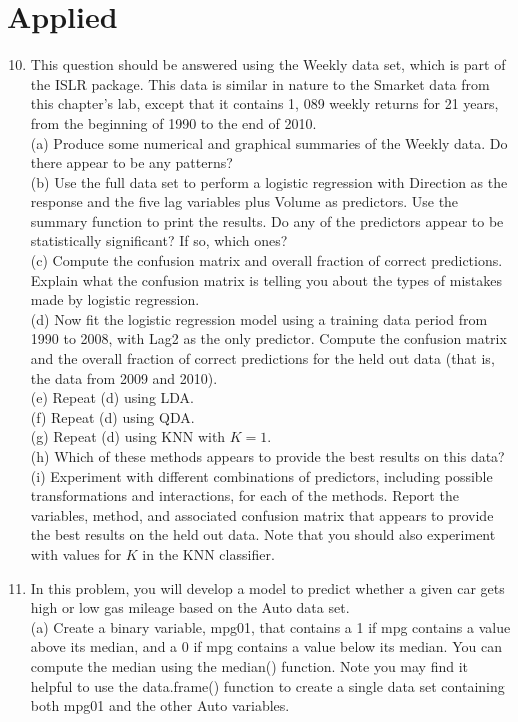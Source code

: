 \documentclass[10pt]{article}
\begin{document}
\section*{Applied}
\begin{enumerate}
  \setcounter{enumi}{9}
  \item This question should be answered using the Weekly data set, which is part of the ISLR package. This data is similar in nature to the Smarket data from this chapter's lab, except that it contains 1, 089 weekly returns for 21 years, from the beginning of 1990 to the end of 2010.\\
(a) Produce some numerical and graphical summaries of the Weekly data. Do there appear to be any patterns?\\
(b) Use the full data set to perform a logistic regression with Direction as the response and the five lag variables plus Volume as predictors. Use the summary function to print the results. Do any of the predictors appear to be statistically significant? If so, which ones?\\
(c) Compute the confusion matrix and overall fraction of correct predictions. Explain what the confusion matrix is telling you about the types of mistakes made by logistic regression.\\
(d) Now fit the logistic regression model using a training data period from 1990 to 2008, with Lag2 as the only predictor. Compute the confusion matrix and the overall fraction of correct predictions for the held out data (that is, the data from 2009 and 2010).\\
(e) Repeat (d) using LDA.\\
(f) Repeat (d) using QDA.\\
(g) Repeat (d) using KNN with $K=1$.\\
(h) Which of these methods appears to provide the best results on this data?\\
(i) Experiment with different combinations of predictors, including possible transformations and interactions, for each of the methods. Report the variables, method, and associated confusion matrix that appears to provide the best results on the held out data. Note that you should also experiment with values for $K$ in the KNN classifier.
  \item In this problem, you will develop a model to predict whether a given car gets high or low gas mileage based on the Auto data set.\\
(a) Create a binary variable, mpg01, that contains a 1 if mpg contains a value above its median, and a 0 if mpg contains a value below its median. You can compute the median using the median() function. Note you may find it helpful to use the data.frame() function to create a single data set containing both mpg01 and the other Auto variables.\

\end{enumerate}
\end{document}
